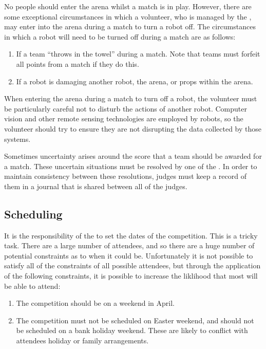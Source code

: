 No people should enter the arena whilst a match is in play.  However, there are some exceptional circumstances in which a volunteer, who is managed by the , may enter into the arena during a match to turn a robot off.  The circumstances in which a robot will need to be turned off during a match are as follows:
\begin{enumerate}
\item If a team ``throws in the towel'' during a match.  Note that teams must forfeit all points from a match if they do this.
\item If a robot is damaging another robot, the arena, or props within the arena.
\end{enumerate}
When entering the arena during a match to turn off a robot, the volunteer must be particularly careful not to disturb the actions of another robot.  Computer vision and other remote sensing technologies are employed by robots, so the volunteer should try to ensure they are not disrupting the data collected by those systems.

Sometimes uncertainty arises around the score that a team should be awarded for a match.  These uncertain situations must be resolved by one of the .  In order to maintain consistency between these resolutions, judges must keep a record of them in a journal that is shared between all of the judges.

\subsection{Scheduling}

It is the responsibility of the  to set the dates of the competition.  This is a tricky task.  There are a large number of attendees, and so there are a huge number of potential constraints as to when it could be.  Unfortunately it is not possible to satisfy all of the constraints of all  possible attendees, but through the application of the following constraints, it is possible to increase the liklihood that most will be able to attend:
\begin{enumerate}
\item The competition should be on a weekend in April.
\item The competition must not be scheduled on Easter weekend, and should not be scheduled on a bank holiday weekend.  These are likely to conflict with attendees holiday or family arrangements.
\end{enumerate}

